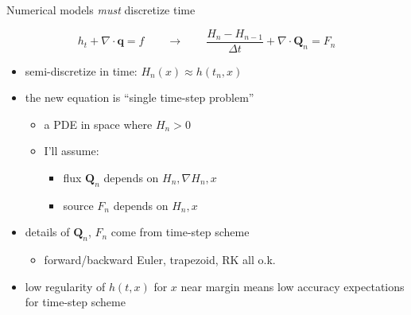 \documentclass{beamer}
\newcommand\bq{\mathbf{q}}
\newcommand\bQ{\mathbf{Q}}
\newcommand{\Div}{\nabla\cdot}
\newcommand{\grad}{\nabla}
\begin{document}
\begin{frame}{Numerical models \emph{must} discretize time}

$$h_t + \Div\bq = f \qquad \to \qquad \frac{H_n - H_{n-1}}{\Delta t} + \Div \bQ_n = F_n$$

  \begin{itemize}
  \item semi-discretize in time: $H_n(x) \approx h(t_n,x)$
  \item<2-> the new equation is ``single time-step problem''
    \begin{itemize}
    \item<2->[$\circ$] a PDE in space \alert{where $H_n>0$}
    \item<2->[$\circ$] I'll assume:
       \begin{itemize}
       \item<2->[$\diamond$] flux $\bQ_n$ depends on $H_n,\grad H_n,x$
       \item<2->[$\diamond$] source $F_n$ depends on $H_n,x$
       \end{itemize}
    \end{itemize}
  \item<3-> details of $\bQ_n$, $F_n$ come from time-step scheme
    \begin{itemize}
    \item<3->[$\circ$] forward/backward Euler, trapezoid, RK all o.k.
    \end{itemize}
  \item<4> low regularity of $h(t,x)$ for $x$ near margin means low accuracy expectations for time-step scheme
  \end{itemize}
\end{frame}
\end{document}
